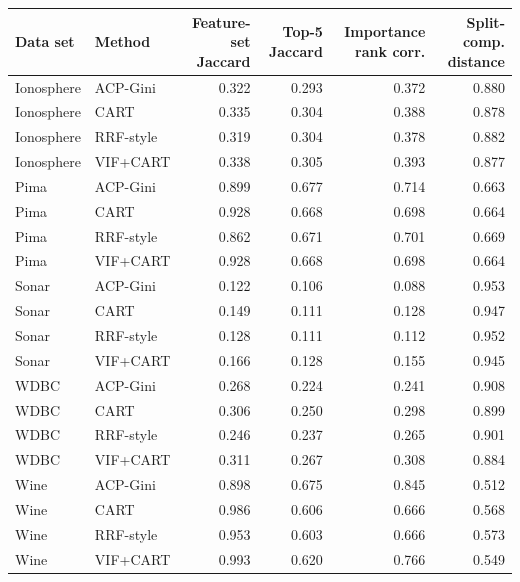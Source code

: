 \begin{tabular}{llrrrr}
\toprule
Data set & Method & Feature-set Jaccard & Top-5 Jaccard & Importance rank corr. & Split-comp. distance \\
\midrule
Ionosphere & ACP-Gini & 0.322 & 0.293 & 0.372 & 0.880 \\
Ionosphere & CART & 0.335 & 0.304 & 0.388 & 0.878 \\
Ionosphere & RRF-style & 0.319 & 0.304 & 0.378 & 0.882 \\
Ionosphere & VIF+CART & 0.338 & 0.305 & 0.393 & 0.877 \\
Pima & ACP-Gini & 0.899 & 0.677 & 0.714 & 0.663 \\
Pima & CART & 0.928 & 0.668 & 0.698 & 0.664 \\
Pima & RRF-style & 0.862 & 0.671 & 0.701 & 0.669 \\
Pima & VIF+CART & 0.928 & 0.668 & 0.698 & 0.664 \\
Sonar & ACP-Gini & 0.122 & 0.106 & 0.088 & 0.953 \\
Sonar & CART & 0.149 & 0.111 & 0.128 & 0.947 \\
Sonar & RRF-style & 0.128 & 0.111 & 0.112 & 0.952 \\
Sonar & VIF+CART & 0.166 & 0.128 & 0.155 & 0.945 \\
WDBC & ACP-Gini & 0.268 & 0.224 & 0.241 & 0.908 \\
WDBC & CART & 0.306 & 0.250 & 0.298 & 0.899 \\
WDBC & RRF-style & 0.246 & 0.237 & 0.265 & 0.901 \\
WDBC & VIF+CART & 0.311 & 0.267 & 0.308 & 0.884 \\
Wine & ACP-Gini & 0.898 & 0.675 & 0.845 & 0.512 \\
Wine & CART & 0.986 & 0.606 & 0.666 & 0.568 \\
Wine & RRF-style & 0.953 & 0.603 & 0.666 & 0.573 \\
Wine & VIF+CART & 0.993 & 0.620 & 0.766 & 0.549 \\
\bottomrule
\end{tabular}
